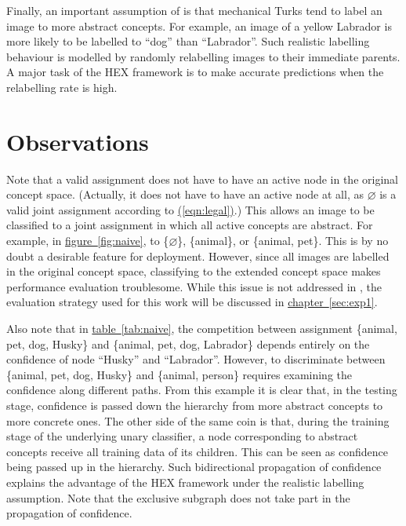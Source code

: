 \documentclass[11pt,a4paper]{book}
\begin{document}
Finally, an important assumption of \cite{deng2014large} is that mechanical Turks tend to label an image to more abstract concepts. For example, an image of a yellow Labrador is more likely to be labelled to ``dog'' than ``Labrador''. Such realistic labelling behaviour is modelled by randomly relabelling images to their immediate parents. A major task of the HEX framework is to make accurate predictions when the relabelling rate is high.

\section{Observations}
\label{sec:observ}

Note that a valid assignment does not have to have an active node in the original concept space. (Actually, it does not have to have an active node at all, as $\varnothing$ is a valid joint assignment according to \hyperref[eqn:legal]{(\ref{eqn:legal})}.) This allows an image to be classified to a joint assignment in which all active concepts are abstract. For example, in \hyperref[fig:naive]{figure~\ref{fig:naive}}, to \{$\varnothing$\}, \{animal\}, or \{animal, pet\}. This is by no doubt a desirable feature for deployment. However, since all images are labelled in the original concept space, classifying to the extended concept space makes performance evaluation troublesome. While this issue is not addressed in \cite{deng2014large}, the evaluation strategy used for this work will be discussed in \hyperref[sec:exp1]{chapter~\ref{sec:exp1}}.

Also note that in \hyperref[tab:naive]{table~\ref{tab:naive}}, the competition between assignment \{animal, pet, dog, Husky\} and \{animal, pet, dog, Labrador\} depends entirely on the confidence of node ``Husky'' and ``Labrador''. However, to discriminate between \{animal, pet, dog, Husky\} and \{animal, person\} requires examining the confidence along different paths. From this example it is clear that, in the testing stage, confidence is passed down the hierarchy from more abstract concepts to more concrete ones. The other side of the same coin is that, during the training stage of the underlying unary classifier, a node corresponding to abstract concepts receive all training data of its children. This can be seen as confidence being passed up in the hierarchy. Such bidirectional propagation of confidence explains the advantage of the HEX framework under the realistic labelling assumption. Note that the exclusive subgraph does not take part in the propagation of confidence.
\end{document}
